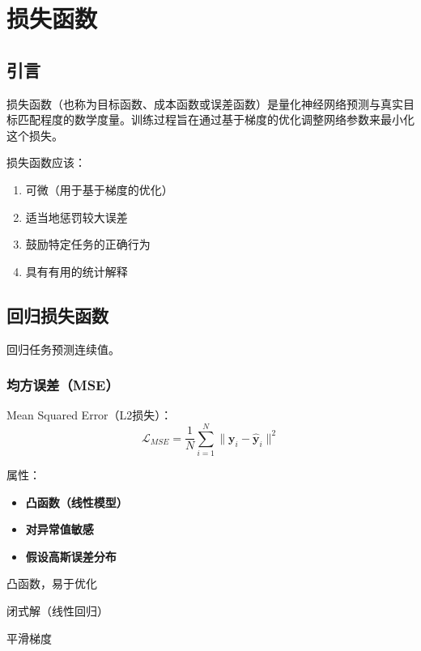 %

\clearpage
\cleardoublepage

\chapter{损失函数}

\section{引言}

损失函数（也称为目标函数、成本函数或误差函数）是量化神经网络预测与真实目标匹配程度的数学度量。训练过程旨在通过基于梯度的优化调整网络参数来最小化这个损失。

损失函数应该：
\begin{enumerate}
    \item 可微（用于基于梯度的优化）
    \item 适当地惩罚较大误差
    \item 鼓励特定任务的正确行为
    \item 具有有用的统计解释
\end{enumerate}

\section{回归损失函数}

回归任务预测连续值。

\subsection{均方误差（MSE）}

Mean Squared Error（L2损失）：
\begin{equation}
\mathcal{L}_{MSE} = \frac{1}{N}\sum_{i=1}^{N} \|\mathbf{y}_i - \hat{\mathbf{y}}_i\|^2
\end{equation}

属性：
\begin{itemize}
    \item \textbf{凸函数（线性模型）}
    \item \textbf{对异常值敏感}
    \item \textbf{假设高斯误差分布}
\end{itemize}

\begin{advantages}
    \item 凸函数，易于优化
    \item 闭式解（线性回归）
    \item 平滑梯度
\end{advantages}

